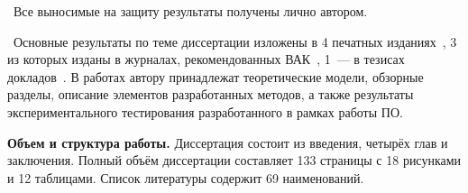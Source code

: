 \contribution\ Все выносимые на защиту результаты получены лично автором.

\publications\ Основные результаты по теме диссертации изложены в 4 печатных изданиях~\cite{summary-impl-mine,summary-intro-mine,summary-inter-unit-mine,info-2015},
3 из которых изданы в журналах, рекомендованных ВАК~\cite{summary-impl-mine,summary-intro-mine,summary-inter-unit-mine}, 
1~--- в тезисах докладов~\cite{info-2015}. В работах \cite{summary-impl-mine,summary-intro-mine,summary-inter-unit-mine} автору принадлежат теоретические модели, обзорные разделы, описание элементов разработанных методов, а также результаты экспериментального тестирования разработанного в рамках работы ПО.

\textbf{Объем и структура работы.} Диссертация состоит из введения, четырёх глав и заключения. Полный объём диссертации составляет 133 страницы с 18 рисунками и 12 таблицами. Список литературы содержит 69 наименований.


